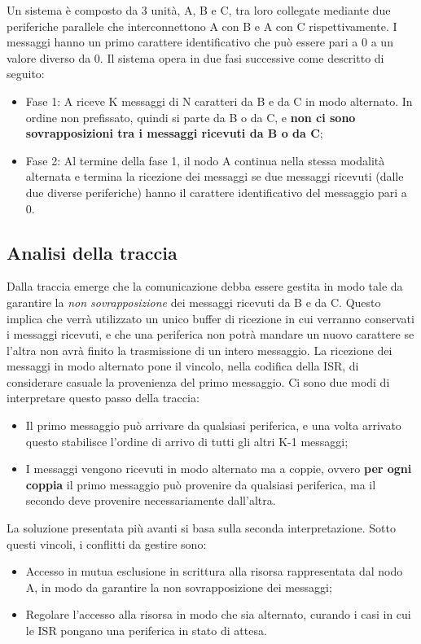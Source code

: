 \documentclass{article}
\begin{document}
Un sistema è composto da 3 unità, A, B e C, tra loro collegate mediante due periferiche parallele che interconnettono A con B e A con C rispettivamente. I messaggi hanno un primo carattere identificativo che può essere pari a 0 a un valore diverso da 0. Il sistema opera in due fasi successive come descritto di seguito:
\begin{itemize}
	\item Fase 1: A riceve K messaggi di N caratteri da B e da C in modo alternato. In ordine non prefissato, quindi si parte da B o da C, e \textbf{non ci sono sovrapposizioni tra i messaggi ricevuti da B o da C};
	\item Fase 2: Al termine della fase 1, il nodo A continua nella stessa modalità alternata e termina la ricezione dei messaggi se due messaggi ricevuti (dalle due diverse periferiche) hanno il carattere identificativo del messaggio pari a 0.
\end{itemize}


\subsection{Analisi della traccia}
Dalla traccia emerge che la comunicazione debba essere gestita in modo tale da garantire la \textit{non sovrapposizione} dei messaggi ricevuti da B e da C. Questo implica che verrà utilizzato un unico buffer di ricezione in cui verranno conservati i messaggi ricevuti, e che una periferica non potrà mandare un nuovo carattere se l'altra non avrà finito la trasmissione di un intero messaggio. La ricezione dei messaggi in modo alternato pone il vincolo, nella codifica della ISR, di considerare casuale la provenienza del primo messaggio. Ci sono due modi di interpretare questo passo della traccia:
\begin{itemize}
	\item Il primo messaggio può arrivare da qualsiasi periferica, e una volta arrivato questo stabilisce l'ordine di arrivo di tutti gli altri K-1 messaggi;
	\item I messaggi vengono ricevuti in modo alternato ma a coppie, ovvero \textbf{per ogni coppia} il primo messaggio può provenire da qualsiasi periferica, ma il secondo deve provenire necessariamente dall'altra.
\end{itemize}
La soluzione presentata più avanti si basa sulla seconda interpretazione. Sotto questi vincoli, i conflitti da gestire sono:
\begin{itemize}
	\item Accesso in mutua esclusione in scrittura alla risorsa rappresentata dal nodo A, in modo da garantire la non sovrapposizione dei messaggi;
	\item Regolare l'accesso alla risorsa in modo che sia alternato, curando i casi in cui le ISR pongano una periferica in stato di attesa. 
\end{itemize}
\end{document}
